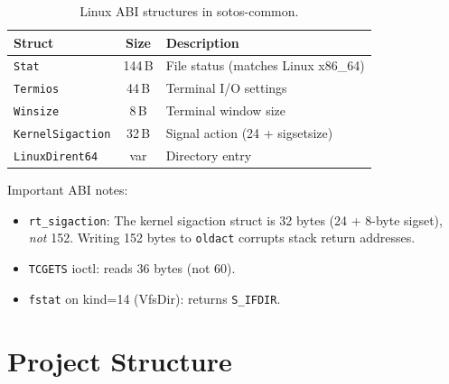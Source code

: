 \documentclass[11pt,a4paper,twoside]{report}
\theoremstyle{definition}
\begin{document}
\begin{table}[H]
\centering
\caption{Linux ABI structures in sotos-common.}
\begin{tabularx}{\textwidth}{l c X}
\toprule
\textbf{Struct} & \textbf{Size} & \textbf{Description} \\
\midrule
\texttt{Stat}             & 144\,B & File status (matches Linux x86\_64) \\
\texttt{Termios}          & 44\,B  & Terminal I/O settings \\
\texttt{Winsize}          & 8\,B   & Terminal window size \\
\texttt{KernelSigaction}  & 32\,B  & Signal action (24 + sigsetsize) \\
\texttt{LinuxDirent64}    & var    & Directory entry \\
\bottomrule
\end{tabularx}
\end{table}

Important ABI notes:
\begin{itemize}[leftmargin=1.4em]
  \item \texttt{rt\_sigaction}: The kernel sigaction struct is 32 bytes
    (24 + 8-byte sigset), \emph{not} 152. Writing 152 bytes to
    \texttt{oldact} corrupts stack return addresses.
  \item \texttt{TCGETS} ioctl: reads 36 bytes (not 60).
  \item \texttt{fstat} on kind=14 (VfsDir): returns \texttt{S\_IFDIR}.
\end{itemize}


\chapter{Project Structure}
\label{app:structure}
\end{document}
